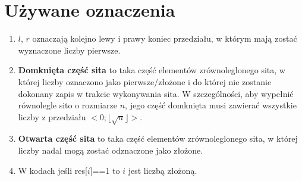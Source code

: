 \documentclass[12pt]{article}
\begin{document}
\section{Używane oznaczenia}
\begin{enumerate}
	\item \(l\), \(r\) oznaczają kolejno lewy i prawy koniec przedziału, w którym mają zostać wyznaczone liczby pierwsze.
	\item \textbf{Domknięta część sita} to taka część elementów zrównoleglonego sita, w której liczby oznaczono jako pierwsze/złożone i do której nie zostanie dokonany zapis w trakcie wykonywania sita. W szczególności, aby wypełnić równolegle sito o rozmiarze \(n\), jego część domknięta musi zawierać wszystkie liczby z przedziału \(<0;\lfloor\sqrt{n}\rfloor>\).
	\item \textbf{Otwarta część sita} to taka część elementów zrównoleglonego sita, w której liczby nadal mogą zostać odznaczone jako złożone.
	\item W kodach jeśli res[\(i\)]==1 to \(i\) jest liczbą złożoną.
\end{enumerate}
\end{document}
